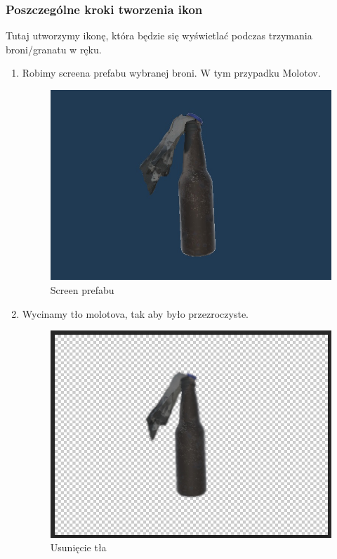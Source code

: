 \subsubsection{Poszczególne kroki tworzenia ikon}
Tutaj utworzymy ikonę, która będzie się wyświetlać podczas trzymania broni/granatu w ręku.
\begin{enumerate}
  \item Robimy screena prefabu wybranej broni. W tym przypadku Molotov.
\begin{figure}[h]
    \centering
    \includegraphics[scale=0.5]{Images/MolotovScreen.jpg}
    \caption{Screen prefabu}
\end{figure}
\FloatBarrier

  \item Wycinamy tło molotova, tak aby było przezroczyste.
\begin{figure}[h]
    \centering
    \includegraphics[scale=0.5]{Images/MolotovPNG.jpg}
    \caption{Usunięcie tła}
\end{figure}
\FloatBarrier


\end{enumerate}
